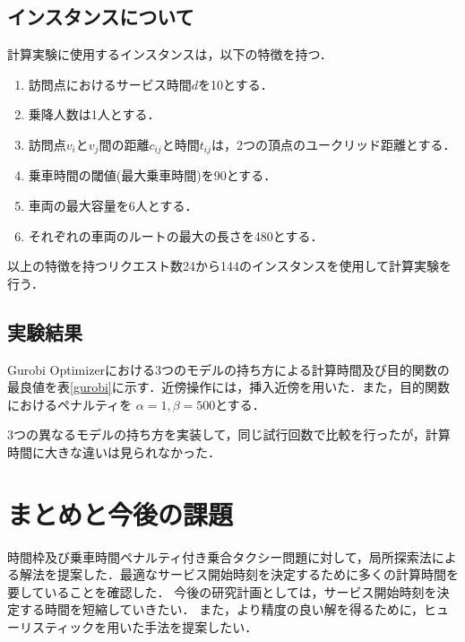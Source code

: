\documentclass[a4j,11pt,twocolumn]{jsarticle}
\begin{document}
\subsection{インスタンスについて}
計算実験に使用するインスタンスは，以下の特徴を持つ．
\begin{enumerate}
 \item 訪問点におけるサービス時間$d$を10とする．
 \item 乗降人数は1人とする．
 \item 訪問点$v_i$と$v_j$間の距離$c_{ij}$と時間$t_{ij}$は，2つの頂点のユークリッド距離とする．
 \item 乗車時間の閾値(最大乗車時間)を90とする．
 \item 車両の最大容量を6人とする．
 \item それぞれの車両のルートの最大の長さを480とする．
\end{enumerate}
以上の特徴を持つリクエスト数24から144のインスタンスを使用して計算実験を行う．

\subsection{実験結果}
Gurobi Optimizerにおける3つのモデルの持ち方による計算時間及び目的関数の最良値を表\ref{gurobi}に示す．近傍操作には，挿入近傍を用いた．また，目的関数におけるペナルティを $α=1, β=500$とする．

3つの異なるモデルの持ち方を実装して，同じ試行回数で比較を行ったが，計算時間に大きな違いは見られなかった．



\section{まとめと今後の課題}
時間枠及び乗車時間ペナルティ付き乗合タクシー問題に対して，局所探索法による解法を提案した．最適なサービス開始時刻を決定するために多くの計算時間を要していることを確認した．
今後の研究計画としては，サービス開始時刻を決定する時間を短縮していきたい．
また，より精度の良い解を得るために，ヒューリスティックを用いた手法を提案したい．
\end{document}
